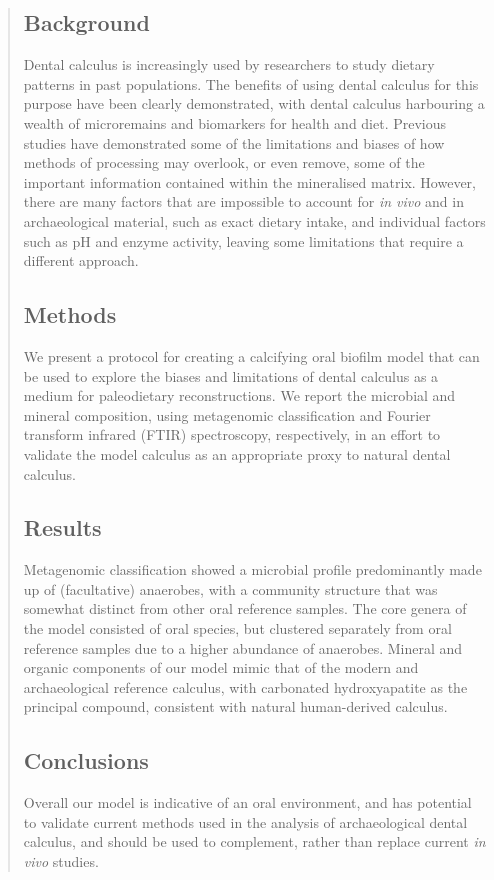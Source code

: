\documentclass[10pt,a4paper]{article}
\begin{document}
\begin{abstract}

\subsection{Background}\label{background}

Dental calculus is increasingly used by researchers to study dietary
patterns in past populations. The benefits of using dental calculus for
this purpose have been clearly demonstrated, with dental calculus
harbouring a wealth of microremains and biomarkers for health and diet.
Previous studies have demonstrated some of the limitations and biases of
how methods of processing may overlook, or even remove, some of the
important information contained within the mineralised matrix. However,
there are many factors that are impossible to account for \emph{in vivo}
and in archaeological material, such as exact dietary intake, and
individual factors such as pH and enzyme activity, leaving some
limitations that require a different approach.

\subsection{Methods}\label{methods}

We present a protocol for creating a calcifying oral biofilm model that
can be used to explore the biases and limitations of dental calculus as
a medium for paleodietary reconstructions. We report the microbial and
mineral composition, using metagenomic classification and Fourier
transform infrared (FTIR) spectroscopy, respectively, in an effort to
validate the model calculus as an appropriate proxy to natural dental
calculus.

\subsection{Results}\label{results}

Metagenomic classification showed a microbial profile predominantly made
up of (facultative) anaerobes, with a community structure that was
somewhat distinct from other oral reference samples. The core genera of
the model consisted of oral species, but clustered separately from oral
reference samples due to a higher abundance of anaerobes. Mineral and
organic components of our model mimic that of the modern and
archaeological reference calculus, with carbonated hydroxyapatite as the
principal compound, consistent with natural human-derived calculus.

\subsection{Conclusions}\label{conclusions}

Overall our model is indicative of an oral environment, and has
potential to validate current methods used in the analysis of
archaeological dental calculus, and should be used to complement, rather
than replace current \emph{in vivo} studies.

\end{abstract}
\end{document}
